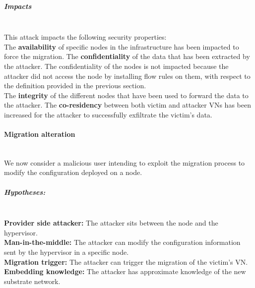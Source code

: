 \subparagraph{Impacts}\textbf{\\}
This attack impacts the following security properties:\\
The \textbf{availability} of specific nodes in the infrastructure has been impacted to force the migration.
The \textbf{confidentiality} of the data that has been extracted by the attacker.
The confidentiality of the nodes is not impacted because the attacker did not access the node by installing flow rules on them, with respect to the definition provided in the previous section.\\
The \textbf{integrity} of the different nodes that have been used to forward the data to the attacker.
The \textbf{co-residency} between both victim and attacker VNs has been increased for the attacker to successfully exfiltrate the victim's data.


\paragraph{Migration alteration}\textbf{\\}
We now consider a malicious user intending to exploit the migration process to modify the configuration deployed on a node.

\subparagraph{Hypotheses:}\textbf{\\}
\textbf{Provider side attacker:} The attacker sits between the node and the hypervisor.\\
\textbf{Man-in-the-middle:} The attacker can modify the configuration information sent by the hypervisor in a specific node.\\
\textbf{Migration trigger:} The attacker can trigger the migration of the victim's VN.\\
\textbf{Embedding knowledge:} The attacker has approximate knowledge of the new substrate network.

